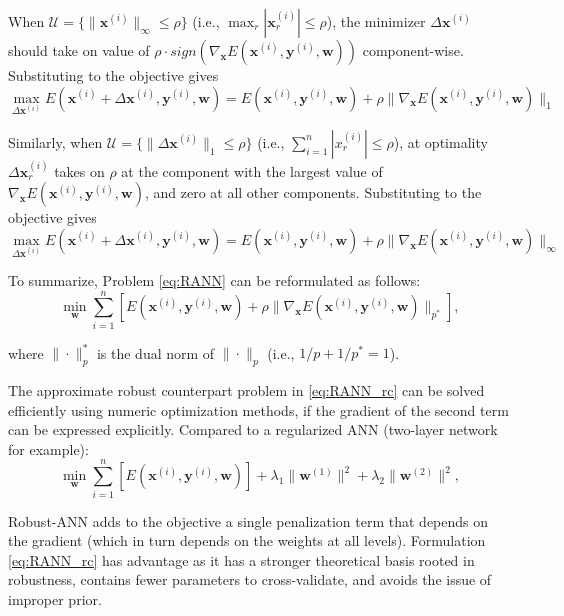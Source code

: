 \documentclass[twoside,12pt]{article}
\newcommand{\M}[1]{\boldsymbol{\mathbf{#1}}}
\newcommand{\Cal}{\mathcal}
\begin{document}
When $\Cal U = \{\| \M x^{(i)} \|_\infty \leq \rho \}$ (i.e., $\max_r |\M x_r^{(i)}| \leq \rho$), the minimizer $\Delta \M x^{(i)}$ should take on value of $\rho \cdot sign(\nabla_{\M x} E(\M x^{(i)}, \M y^{(i)}, \M w))$ component-wise. Substituting to the objective gives
\begin{equation*}\label{eq:RANN_inner_linf}
\max_{\Delta \M x^{(i)}}  E(\M x^{(i)} + \Delta \M x^{(i)}, \M y^{(i)}, \M w) = E(\M x^{(i)}, \M y^{(i)}, \M w) + \rho \| \nabla_{\M x} E(\M x^{(i)}, \M y^{(i)}, \M w) \|_1
\end{equation*}

Similarly, when $\Cal U = \{\| \Delta \M x^{(i)} \|_1 \leq \rho \}$ (i.e., $\sum_{i=1}^n |x_r^{(i)}| \leq \rho$), at optimality $\Delta \M x_r^{(i)}$ takes on $\rho$ at the component with the largest value of $\nabla_{\M x} E(\M x^{(i)}, \M y^{(i)}, \M w)$, and zero at all other components. Substituting to the objective gives
\begin{equation*}\label{eq:RANN_inner_l1}
\max_{\Delta \M x^{(i)}}  E(\M x^{(i)} + \Delta \M x^{(i)}, \M y^{(i)}, \M w) = E(\M x^{(i)}, \M y^{(i)}, \M w) + \rho \| \nabla_{\M x} E(\M x^{(i)}, \M y^{(i)}, \M w) \|_\infty
\end{equation*}

To summarize, Problem \eqref{eq:RANN} can be reformulated as follows:
\begin{equation}\label{eq:RANN_rc}
\min_{\M w} \sum_{i=1}^n \left[E(\M x^{(i)}, \M y^{(i)}, \M w) + \rho \| \nabla_{\M x} E(\M x^{(i)}, \M y^{(i)}, \M w) \|_{p^*}\right],
\end{equation}

where $\|\cdot \|_p^*$ is the dual norm of $\|\cdot \|_p$ (i.e., $1/p + 1/p^* = 1$).

The approximate robust counterpart problem in \eqref{eq:RANN_rc} can be solved efficiently using numeric optimization methods, if the gradient of the second term can be expressed explicitly. Compared to a regularized ANN (two-layer network for example):
\begin{equation*}
\min_{\M w} \sum_{i=1}^n \left[E(\M x^{(i)}, \M y^{(i)}, \M w)\right] + \lambda_1 \| \M w^{(1)}\|^2 + \lambda_2 \| \M w^{(2)}\|^2,
\end{equation*}
 
Robust-ANN adds to the objective a single penalization term that depends on the gradient (which in turn depends on the weights at all levels). Formulation \eqref{eq:RANN_rc} has advantage as it has a stronger theoretical basis rooted in robustness, contains fewer parameters to cross-validate, and avoids the issue of improper prior.
 
\end{document}

